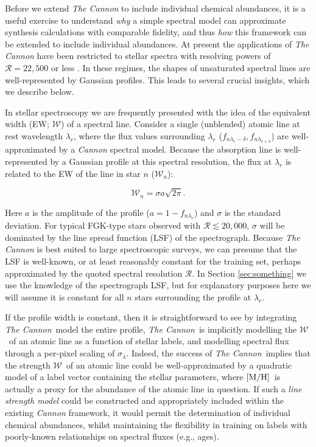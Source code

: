 \documentclass[useAMS,usenatbib]{mn2e}
\newcommand\tc{\textit{The Cannon}}
\newcommand\mh{${\rm [M/H]}$}
\newcommand\ew{$\mathcal{W}$}
\begin{document}
Before we extend \tc{} to include individual chemical abundances, it is a useful
 exercise to understand \textit{why} a simple spectral model can 
approximate synthesis calculations with comparable fidelity, and thus 
\textit{how} this framework can be extended to include individual abundances. At
present the applications of \tc{} have been restricted to stellar spectra with 
resolving powers of $\mathcal{R} = 22,500$ \citep[APOGEE;][]{Ness15a} or less 
\citep[e.g., LAMOST;][]{Ho15}. In these regimes, the shapes of unsaturated 
spectral lines are well-represented by Gaussian profiles. This leads to several 
crucial insights, which we describe below.

In stellar spectroscopy we are frequently presented with the idea of the 
equivalent width (EW; $\mathcal{W}$) of a spectral line. Consider a single 
(unblended) atomic line at rest wavelength $\lambda_r$, where the flux values 
surrounding $\lambda_r$ ($f_{n\lambda_r-{\delta}},f_{n\lambda_{r+\delta}}$) are 
well-approximated by a \textit{Cannon} spectral model. Because the absorption 
line is well-represented by a Gaussian profile at this spectral resolution, the 
flux at $\lambda_r$ is related to the EW of the line in star $n$ ($\mathcal{W}_n$):

\begin{equation}
\mathcal{W}_n = \sigma{}a\sqrt{2\pi}.
\label{eq:ew-flux}
\end{equation}

Here $a$ is the amplitude of the profile ($a = 1 - f_{n\lambda_r}$) and $\sigma$ 
is the standard deviation. For typical FGK-type
stars observed with $\mathcal{R} \lesssim 20,000$, $\sigma$ will be dominated
by the line spread function (LSF) of the spectrograph. Because \tc{} is best suited
to large spectroscopic surveys, we can presume that the LSF is well-known, or
at least reasonably constant for the training set, perhaps approximated by the 
quoted spectral resolution $\mathcal{R}$. In Section \ref{sec:something} we use
the knowledge of the spectrograph LSF, but for explanatory purposes here we will
assume it is constant for all $n$ stars surrounding the profile at $\lambda_r$.

If the profile width is constant, then it is straightforward to see by integrating
\tc\ model the entire profile, \tc\ is implicitly modelling the \ew\ of an atomic line
as a function of stellar labels, and modelling spectral flux through a per-pixel
scaling of $\sigma_\lambda$. Indeed, the success of \tc\ implies that the 
strength \ew\ of an atomic line could be well-approximated by a quadratic
model of a label vector containing the stellar parameters, where \mh\ is 
actually a proxy for the abundance of the atomic line in question. If such a
\textit{line strength model} could be constructed and appropriately
included within the existing \textit{Cannon} framework, it would permit the 
determination of individual chemical abundances, whilst maintaining the 
flexibility in training on labels with poorly-known relationships on spectral 
fluxes (e.g., ages).
\end{document}
